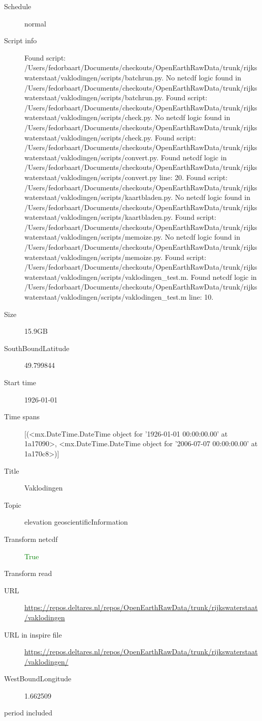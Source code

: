 \documentclass[9]{report}
\begin{document}
\begin{description}
\begin{verbatim}
\end{verbatim}
  \item[Schedule] normal
  \item[Script info] Found script: /Users/fedorbaart/Documents/checkouts/OpenEarthRawData/trunk/rijkswaterstaat/vaklodingen/scripts/batchrun.py.
No netcdf logic found in /Users/fedorbaart/Documents/checkouts/OpenEarthRawData/trunk/rijkswaterstaat/vaklodingen/scripts/batchrun.py.
Found script: /Users/fedorbaart/Documents/checkouts/OpenEarthRawData/trunk/rijkswaterstaat/vaklodingen/scripts/check.py.
No netcdf logic found in /Users/fedorbaart/Documents/checkouts/OpenEarthRawData/trunk/rijkswaterstaat/vaklodingen/scripts/check.py.
Found script: /Users/fedorbaart/Documents/checkouts/OpenEarthRawData/trunk/rijkswaterstaat/vaklodingen/scripts/convert.py.
Found netcdf logic in /Users/fedorbaart/Documents/checkouts/OpenEarthRawData/trunk/rijkswaterstaat/vaklodingen/scripts/convert.py line: 20.
Found script: /Users/fedorbaart/Documents/checkouts/OpenEarthRawData/trunk/rijkswaterstaat/vaklodingen/scripts/kaartbladen.py.
No netcdf logic found in /Users/fedorbaart/Documents/checkouts/OpenEarthRawData/trunk/rijkswaterstaat/vaklodingen/scripts/kaartbladen.py.
Found script: /Users/fedorbaart/Documents/checkouts/OpenEarthRawData/trunk/rijkswaterstaat/vaklodingen/scripts/memoize.py.
No netcdf logic found in /Users/fedorbaart/Documents/checkouts/OpenEarthRawData/trunk/rijkswaterstaat/vaklodingen/scripts/memoize.py.
Found script: /Users/fedorbaart/Documents/checkouts/OpenEarthRawData/trunk/rijkswaterstaat/vaklodingen/scripts/vaklodingen\_test.m.
Found netcdf logic in /Users/fedorbaart/Documents/checkouts/OpenEarthRawData/trunk/rijkswaterstaat/vaklodingen/scripts/vaklodingen\_test.m line: 10.
  \item[Size] 15.9GB
  \item[SouthBoundLatitude] 49.799844
  \item[Start time] 1926-01-01
  \item[Time spans] [(<mx.DateTime.DateTime object for '1926-01-01 00:00:00.00' at 1a17090>, <mx.DateTime.DateTime object for '2006-07-07 00:00:00.00' at 1a170c8>)]
  \item[Title]  Vaklodingen 
  \item[Topic] elevation geoscientificInformation
  \item[Transform netcdf] \textcolor{green}{True}
  \item[Transform read] \textcolor{blue}{}
  \item[URL] \href{https://repos.deltares.nl/repos/OpenEarthRawData/trunk/rijkswaterstaat/vaklodingen}{https://repos.deltares.nl/repos/OpenEarthRawData/trunk/rijkswaterstaat/vaklodingen}
  \item[URL in inspire file] \href{https://repos.deltares.nl/repos/OpenEarthRawData/trunk/rijkswaterstaat/vaklodingen/}{https://repos.deltares.nl/repos/OpenEarthRawData/trunk/rijkswaterstaat/vaklodingen/}
  \item[WestBoundLongitude] 1.662509
  \item[period included] 
\end{description}
\end{document}
